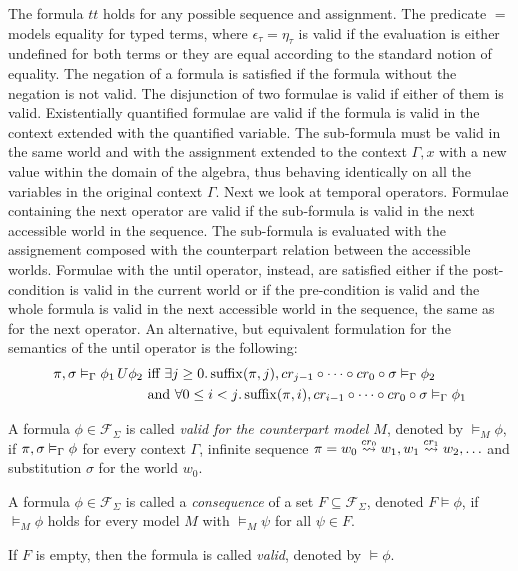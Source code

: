 The formula $tt$ holds for any possible sequence and assignment. The predicate $=$ models equality for typed terms, where
$\epsilon_\tau = \eta_\tau$ is valid if the evaluation is either undefined for both terms or they are equal according to
the standard notion of equality. The negation of a formula is satisfied if the formula without the negation is not
valid. The disjunction of two formulae is valid if either of them is valid. Existentially quantified formulae are valid
if the formula is valid in the context extended with the quantified variable. The sub-formula must be valid in the same
world and with the assignment extended to the context $\Gamma, x$ with a new value within the domain of the algebra,
thus behaving identically on all the variables in the original context $\Gamma$. Next we look at temporal operators.
Formulae containing the next operator are valid if the sub-formula is valid in the next accessible world in the sequence.
The sub-formula is evaluated with the assignement composed with the counterpart relation between the accessible worlds.
Formulae with the until operator, instead, are satisfied either if the post-condition is valid in the current world or 
if the pre-condition is valid and the whole formula is valid in the next accessible world in the sequence, the same as
for the next operator. An alternative, but equivalent formulation for the semantics of the until operator is the following:
\begin{align*}
  \pi, \sigma \vDash_\Gamma {\phi_1}\,U {\phi_2}
      &\text{ iff } \exists {j \geq 0} \ldotp {{\operatorname{suffix}(\pi,j)}, {cr_{j-1} \circ \cdots \circ cr_0 \circ \sigma} \vDash_{\Gamma} {\phi_2}} \\
      &\text{ and } \forall {0 \leq i < j} \ldotp {{\operatorname{suffix}(\pi,i)}, {cr_{i-1} \circ \cdots \circ cr_0 \circ \sigma} \vDash_{\Gamma} {\phi_1}}
\end{align*}

\begin{definition}
  A formula $\phi \in \mathcal{F}_\Sigma$ is called \emph{valid for the counterpart model $M$}, denoted by $\vDash_M
  \phi$, if ${\pi}, {\sigma} \vDash_{\Gamma} {\phi}$ for every context $\Gamma$, infinite sequence $\pi = w_0 \overset{cr_0}{\rightsquigarrow} w_1,w_1 \overset{cr_1}{\rightsquigarrow} w_2,\ldots$ and substitution $\sigma$ for the world $w_0$.
\end{definition}
\begin{definition}
  A formula $\phi \in \mathcal{F}_\Sigma$ is called a \emph{consequence} of a set $F \subseteq \mathcal{F}_\Sigma$,
  denoted $F \vDash \phi$, if $\vDash_M \phi$ holds for every model $M$ with $\vDash_M \psi$ for all $\psi \in F$.

  If $F$ is empty, then the formula is called \emph{valid}, denoted by $\vDash \phi$.
\end{definition}

